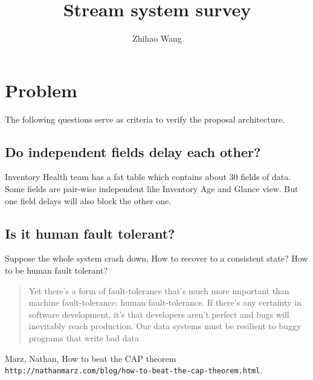 \documentclass[12pt]{article}
\title{Stream system survey}
\author{Zhihao Wang}
\begin{document}
\maketitle

\section{Problem}
The following questions serve as criteria to verify the proposal architecture.

\subsection{Do independent fields delay each other?}
Inventory Health team has a fat table which contains about 30 fields of data. Some fields are pair-wise independent like Inventory Age and Glance view. But one field delays will also block the other one.

\subsection{Is it human fault tolerant?}
Suppose the whole system crash down, How to recover to a consistent state? How to be human fault tolerant?
\begin{quote}
Yet there's a form of fault-tolerance that's much more important than machine fault-tolerance: human fault-tolerance. If there's any certainty in software development, it's that developers aren't perfect and bugs will inevitably reach production. Our data systems must be resilient to buggy programs that write bad data \cite{latexcompanion}
\end{quote}

\begin{thebibliography}{9}
     Marz, Nathan, How to beat the CAP theorem \texttt{http://nathanmarz.com/blog/how-to-beat-the-cap-theorem.html}.
\end{thebibliography}
\end{document}
